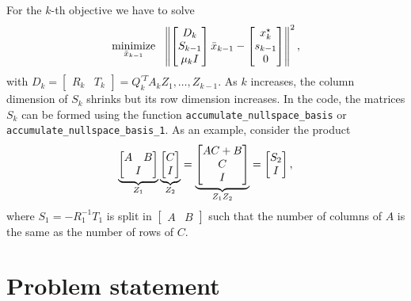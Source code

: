 \documentclass[12pt]{article}
\begin{document}
For the $k$-th objective we have to solve
%
\begin{align*}
  \mathop{\mbox{minimize}}_{\bar{x}_{k-1}} \ \  \left\lVert\begin{bmatrix} D_k \\ S_{k-1} \\ \mu_kI \end{bmatrix}\bar{x}_{k-1} -
    \begin{bmatrix} x_{k}^{\star} \\ s_{k-1} \\ 0 \end{bmatrix}\right\rVert^2,
\end{align*}
%
with $D_k = \begin{bmatrix} R_k & T_k\end{bmatrix} = Q_k^{'T}A_kZ_1,\dots,Z_{k-1}$. As $k$
  increases, the column dimension of $S_{k}$ shrinks but its row dimension increases. In the code,
  the matrices $S_k$ can be formed using the function
  {\color{blue}\verb|accumulate_nullspace_basis|} or
  {\color{blue}\verb|accumulate_nullspace_basis_1|}. As an example, consider the product
  \begin{align*}
    \underbrace{\begin{bmatrix} A & B \\ \multicolumn{2}{c}{I} \end{bmatrix}}_{Z_1}
    \underbrace{\begin{bmatrix} C \\ I \end{bmatrix}}_{Z_2} =
    \underbrace{\begin{bmatrix} AC + B \\ C \\ I \end{bmatrix}}_{Z_1Z_2} =
    \begin{bmatrix} S_2 \\ I \end{bmatrix},
  \end{align*}
  where $S_1 = -R_1^{-1}T_1$ is split in $\begin{bmatrix} A & B \end{bmatrix}$ such that the number of
  columns of $A$ is the same as the number of rows of $C$.

  \newpage

\section{Problem statement}
\end{document}
